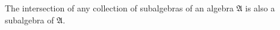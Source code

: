 The intersection of any collection of subalgebras of an algebra $\mathfrak{A}$ is also a subalgebra of $\mathfrak{A}$.
